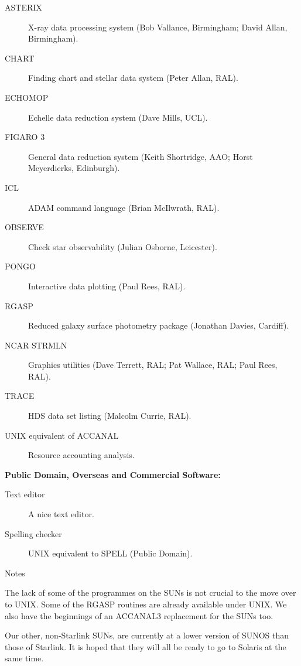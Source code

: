 \begin{description}
\item[ASTERIX] X-ray data processing system (Bob Vallance, Birmingham; 
David Allan, Birmingham).
\item[CHART] Finding chart and stellar data system (Peter Allan, RAL).
\item[ECHOMOP] Echelle data reduction system (Dave Mills, UCL).
\item[FIGARO 3] General data reduction system (Keith Shortridge, AAO; Horst
Meyerdierks, Edinburgh).
\item[ICL] ADAM command language (Brian McIlwrath, RAL).
\item[OBSERVE] Check star observability (Julian Osborne, Leicester).
\item[PONGO] Interactive data plotting (Paul Rees, RAL).
\item[RGASP] Reduced galaxy surface photometry package (Jonathan Davies, 
Cardiff).
\item[NCAR STRMLN] Graphics utilities (Dave Terrett, RAL; Pat Wallace, RAL;
Paul Rees, RAL).
\item[TRACE] HDS data set listing (Malcolm Currie, RAL).
\item[UNIX equivalent of ACCANAL] Resource accounting analysis.
\end{description}


\vspace{5mm}
\begin{center}
{\bf Public Domain, Overseas and Commercial Software:}
\end{center}

\begin{description}
\item[Text editor] A nice text editor.
\item[Spelling checker] UNIX equivalent to SPELL (Public Domain).
\end{description}


\vspace{5mm}
\begin{center}
{\large\sc Notes}
\end{center}

The lack of some of the programmes on the SUNs is not crucial to the move
over to UNIX. 
Some of the RGASP routines are already available under UNIX.
We also have the beginnings of an ACCANAL3 replacement for the SUNs too.

Our other, non-Starlink SUNs, are currently at a lower version of SUNOS than
those of Starlink.
It is hoped that they will all be ready to go to Solaris at the same time.


